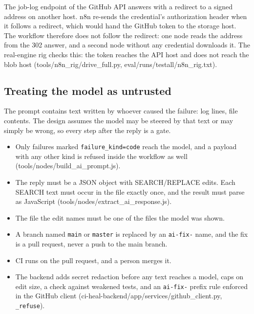 The job-log endpoint of the GitHub API answers with a redirect to a signed address on another host. n8n re-sends the credential's authorization header when it follows a redirect, which would hand the GitHub token to the storage host. The workflow therefore does not follow the redirect: one node reads the address from the 302 answer, and a second node without any credential downloads it. The real-engine rig checks this: the token reaches the API host and does not reach the blob host (tools/\allowbreak{}n8n\_\allowbreak{}rig/\allowbreak{}drive\_\allowbreak{}full.py, eval/\allowbreak{}runs/\allowbreak{}testall/\allowbreak{}n8n\_\allowbreak{}rig.txt).

\subsection{Treating the model as untrusted}

The prompt contains text written by whoever caused the failure: log lines, file contents. The design assumes the model may be steered by that text or may simply be wrong, so every step after the reply is a gate.

\begin{itemize}[leftmargin=*, itemsep=2pt]
\item Only failures marked \texttt{failure\_\allowbreak{}kind=code} reach the model, and a payload with any other kind is refused inside the workflow as well (tools/\allowbreak{}nodes/\allowbreak{}build\_\allowbreak{}ai\_\allowbreak{}prompt.js).
\item The reply must be a JSON object with SEARCH/\allowbreak{}REPLACE edits. Each SEARCH text must occur in the file exactly once, and the result must parse as JavaScript (tools/\allowbreak{}nodes/\allowbreak{}extract\_\allowbreak{}ai\_\allowbreak{}response.js).
\item The file the edit names must be one of the files the model was shown.
\item A branch named \texttt{main} or \texttt{master} is replaced by an \texttt{ai-\allowbreak{}fix-\allowbreak{}} name, and the fix is a pull request, never a push to the main branch.
\item CI runs on the pull request, and a person merges it.
\item The backend adds secret redaction before any text reaches a model, caps on edit size, a check against weakened tests, and an \texttt{ai-\allowbreak{}fix-\allowbreak{}} prefix rule enforced in the GitHub client (ci-heal-backend/\allowbreak{}app/\allowbreak{}services/\allowbreak{}github\_\allowbreak{}client.py, \texttt{\_\allowbreak{}refuse}).
\end{itemize}


